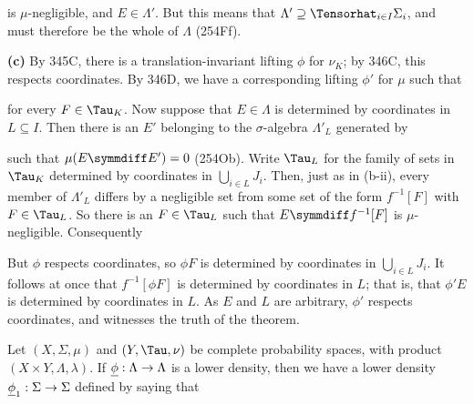 {

\noindent is $\mu$-negligible, and $E\in\Lambda'$.   But this means
that $\Lambda'\supseteq\Tensorhat_{i\in I}\Sigma_i$, and must therefore
be the whole of $\Lambda$ (254Ff).
\Qed

\medskip

{\bf (c)} By 345C, there is a translation-invariant lifting $\phi$ for
$\nu_K$;  by 346C, this respects coordinates.   By 346D, we have a
corresponding lifting $\phi'$ for $\mu$ such that


\noindent for every $F\in\Tau_K$.   Now suppose that
$E\in\Lambda$ is determined by coordinates in $L\subseteq I$.   Then
there is an $E'$ belonging to the $\sigma$-algebra $\Lambda'_L$
generated by


\noindent such that $\mu(E\symmdiff E')=0$ (254Ob).   Write
$\Tau_L$ for the family of sets in $\Tau_K$ determined by coordinates in
$\bigcup_{i\in L}J_i$.   Then, just as in (b-ii), every member of
$\Lambda'_L$ differs by a negligible set from some set of the form
$f^{-1}[F]$ with $F\in\Tau_L$.   So there is an $F\in\Tau_L$ such that
$E\symmdiff f^{-1}[F]$ is $\mu$-negligible.   Consequently


\noindent But $\phi$ respects coordinates, so $\phi F$ is determined by
coordinates in $\bigcup_{i\in L}J_i$.   It follows at once that
$f^{-1}[\phi F]$ is determined by coordinates in $L$;  that is, that
$\phi'E$ is determined by coordinates in $L$.   As $E$ and $L$ are
arbitrary, $\phi'$ respects coordinates, and witnesses the truth of the
theorem.
}%

 Let $(X,\Sigma,\mu)$ and $(Y,\Tau,\nu)$ be
complete probability spaces, with product $(X\times
Y,\Lambda,\lambda)$.   If ${\underline{\phi}}:\Lambda\to\Lambda$ is a lower
density, then we have a lower density ${\underline{\phi}}_1:\Sigma\to\Sigma$
defined by saying that

